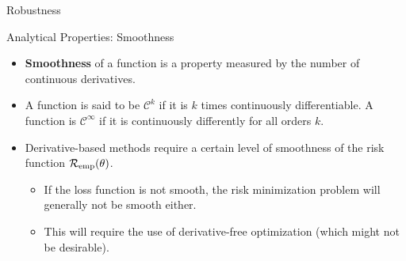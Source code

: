 \begin{vbframe}{Robustness}
% 
% 

\end{vbframe}


\begin{vbframe}{Analytical Properties: Smoothness}


\begin{itemize}
  \small
  \item \textbf{Smoothness} of a function is a property measured by 
  the number of continuous derivatives. 
  \item A function is said to be $\mathcal{C}^k$ if it is $k$ times 
  continuously differentiable. A function is $\mathcal{C}^\infty$ if it is 
  continuously differently for all orders $k$. 
  \item Derivative-based methods require a certain level of smoothness of the 
  risk function $\mathcal{R}_{\text{emp}}(\theta)$. 
  \begin{itemize}
    \small
    \item If the loss function is not smooth, the risk minimization problem will
    generally not be smooth either. 
    \item This will require the use of derivative-free optimization (which 
    might not be desirable).
  \end{itemize}
\end{itemize}

\vfill


\end{vbframe}
